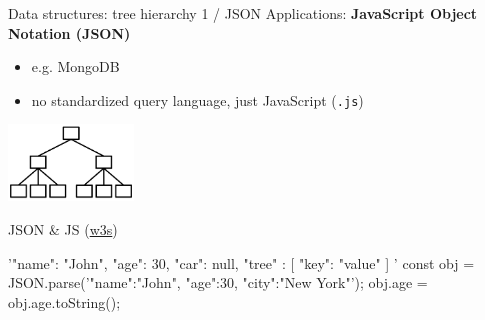 \begin{frame}[fragile]{Data structures: tree hierarchy 1 / JSON}
    Applications: \textbf{JavaScript Object Notation (JSON)}
          \begin{itemize}\footnotesize
              \item e.g. MongoDB
              \item no standardized query language, just JavaScript (\texttt{.js})
          \end{itemize}

\begin{block}{}      
\begin{flushright}
        \includegraphics[width=0.25\textwidth]{img/baumstruktur.png}
\end{flushright}
\end{block}

JSON \& JS (\href{https://www.w3schools.com/js/js_json_intro.asp}{w3s})
\begin{jscode}
'{"name": "John", "age": 30, "car": null, 
  "tree" : [
    "key": "value"
  ]
}'
const obj = JSON.parse('{"name":"John", "age":30, "city":"New York"}');
obj.age = obj.age.toString();
\end{jscode}

\end{frame}


